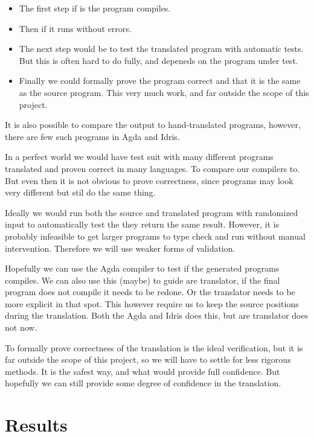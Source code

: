 \documentclass[parskip=half]{scrartcl}
\begin{document}
\begin{itemize}
\item The first step if is the program compiles.
\item Then if it runs without errors.
\item The next step would be to test the translated program with automatic tests.
  But this is often hard to do fully, and depeneds on the program under test.
\item Finally we could formally prove the program correct and that it is the same
  as the source program. This very much work, and far outside the scope of this
  project.
\end{itemize}

It is also possible to compare the output to hand-translated programs, however,
there are few such programs in Agda and Idris.

In a perfect world we would have test suit with many different programs
translated and proven correct in many languages. To compare our compilers to.
But even then it is not obvious to prove correctness, since programs may look
very different but stil do the same thing.

Ideally we would run both the source and translated program with randomized
input to automatically test the they return the same result. However, it is
probably infeasible to get larger programs to type check and run without manual
intervention.  Therefore we will use weaker forms of validation.

Hopefully we can use the Agda compiler to test if the generated programs
compiles. We can also use this (maybe) to guide are translator, if the final
program does not compile it needs to be redone. Or the translator needs to be
more explicit in that spot. This however require us to keep the source
positions during the translation. Both the Agda and Idris does this, but are
translator does not now.

To formally prove correctness of the translation is the ideal verification, but
it is far outside the scope of this project, so we will have to settle for less
rigorous methods. It is the safest way, and what would provide full confidence.
But hopefully we can still provide some degree of confidence in the
translation.


\section{Results}
\end{document}
